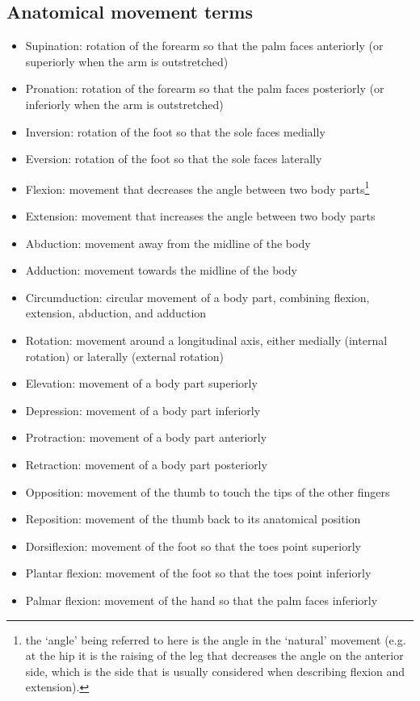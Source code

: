 \subsection{Anatomical movement terms}

\begin{itemize}
    \item Supination: rotation of the forearm so that the palm faces anteriorly (or superiorly when the arm is outstretched)
    \item Pronation: rotation of the forearm so that the palm faces posteriorly (or inferiorly when the arm is outstretched)
    \item Inversion: rotation of the foot so that the sole faces medially
    \item Eversion: rotation of the foot so that the sole faces laterally
    \item Flexion: movement that decreases the angle between two body parts\footnote{\label{fn:angle} the `angle' being referred to here is the angle in the `natural' movement (e.g. at the hip it is the raising of the leg that decreases the angle on the anterior side, which is the side that is usually considered when describing flexion and extension).}
    \item Extension: movement that increases the angle between two body parts\footnotemark[\value{footnote}]
    \item Abduction: movement away from the midline of the body
    \item Adduction: movement towards the midline of the body
    \item Circumduction: circular movement of a body part, combining flexion, extension, abduction, and adduction
    \item Rotation: movement around a longitudinal axis, either medially (internal rotation) or laterally (external rotation)
    \item Elevation: movement of a body part superiorly
    \item Depression: movement of a body part inferiorly
    \item Protraction: movement of a body part anteriorly
    \item Retraction: movement of a body part posteriorly
    \item Opposition: movement of the thumb to touch the tips of the other fingers
    \item Reposition: movement of the thumb back to its anatomical position
    \item Dorsiflexion: movement of the foot so that the toes point superiorly
    \item Plantar flexion: movement of the foot so that the toes point inferiorly
    \item Palmar flexion: movement of the hand so that the palm faces inferiorly
\end{itemize}

